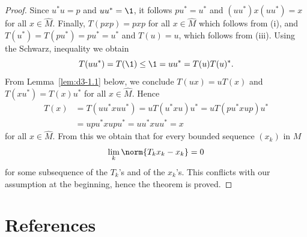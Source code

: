 \begin{proof}
Since $u^{*}u = p$ and $uu^{*} = \1$, it follows $pu^{*} = u^{*}$ and $(uu^{*})x(uu^{*}) = x$ for all $x \in \widehat{M}$.
Finally, $T(pxp) = pxp$ for all $x \in \widehat{M}$ which follows from (i), and $T(u^{*}) = T(pu^{*}) = pu^{*} = u^{*}$ and $T(u) = u$, which follows from (iii).
Using the Schwarz, inequality we obtain
\[
	T(uu^{*}) = T(\1) \leq \1 = uu^{*} = T(u)T(u)^{*}.
\]
From Lemma~\ref{lem:d3-1.1} below, we conclude $T(ux) = uT(x)$ and $T(xu^{*}) = T(x)u^{*}$ for all $x \in \widehat{M}$.
Hence
\begin{align*}
T(x) &= T(uu^{*}xuu^{*}) = uT(u^{*}xu)u^{*} = uT(pu^{*}xup)u^{*} \\
&= upu^{*}xupu^{*} = uu^{*}xuu^{*} = x
\end{align*}
for all $x \in \widehat{M}$.
From this we obtain that for every bounded sequence $(x_{k})$ in $M$
\[
	\lim_k \norm{T_k x_{k} - x_{k}} = 0
\]
for some subsequence of the $T_{k}$'s and of the $x_{k}$'s.
This conflicts with our assumption at the beginning, hence the theorem is proved.
\end{proof}
\section*{References}
{\RaggedRight
  \printbibliography[heading=none]
 }